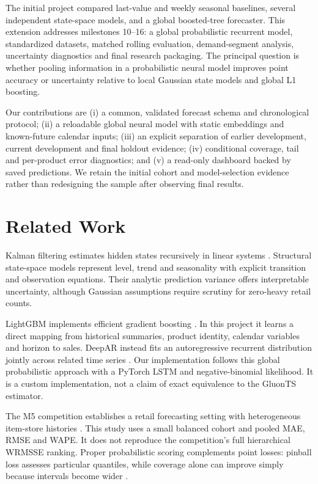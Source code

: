 \documentclass[conference]{IEEEtran}
\begin{document}
The initial project compared last-value and weekly seasonal baselines, several independent state-space models, and a global boosted-tree forecaster. This extension addresses milestones 10--16: a global probabilistic recurrent model, standardized datasets, matched rolling evaluation, demand-segment analysis, uncertainty diagnostics and final research packaging. The principal question is whether pooling information in a probabilistic neural model improves point accuracy or uncertainty relative to local Gaussian state models and global L1 boosting.

Our contributions are (i) a common, validated forecast schema and chronological protocol; (ii) a reloadable global neural model with static embeddings and known-future calendar inputs; (iii) an explicit separation of earlier development, current development and final holdout evidence; (iv) conditional coverage, tail and per-product error diagnostics; and (v) a read-only dashboard backed by saved predictions. We retain the initial cohort and model-selection evidence rather than redesigning the sample after observing final results.

\section{Related Work}
Kalman filtering estimates hidden states recursively in linear systems \cite{kalman}. Structural state-space models represent level, trend and seasonality with explicit transition and observation equations. Their analytic prediction variance offers interpretable uncertainty, although Gaussian assumptions require scrutiny for zero-heavy retail counts.

LightGBM implements efficient gradient boosting \cite{lightgbm}. In this project it learns a direct mapping from historical summaries, product identity, calendar variables and horizon to sales. DeepAR instead fits an autoregressive recurrent distribution jointly across related time series \cite{deepar}. Our implementation follows this global probabilistic approach with a PyTorch LSTM and negative-binomial likelihood. It is a custom implementation, not a claim of exact equivalence to the GluonTS estimator.

The M5 competition establishes a retail forecasting setting with heterogeneous item-store histories \cite{m5}. This study uses a small balanced cohort and pooled MAE, RMSE and WAPE. It does not reproduce the competition's full hierarchical WRMSSE ranking. Proper probabilistic scoring complements point losses: pinball loss assesses particular quantiles, while coverage alone can improve simply because intervals become wider \cite{gneiting}.
\end{document}
